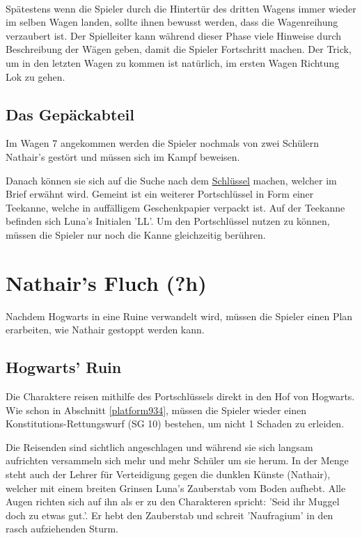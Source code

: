 \documentclass[]{scrartcl}
\begin{document}
~\\

Spätestens wenn die Spieler durch die Hintertür des dritten Wagens immer wieder im selben Wagen landen, sollte ihnen bewusst werden, dass die Wagenreihung verzaubert ist. Der Spielleiter kann während dieser Phase viele Hinweise durch Beschreibung der Wägen geben, damit die Spieler Fortschritt machen. Der Trick, um in den letzten Wagen zu kommen ist natürlich, im ersten Wagen Richtung Lok zu gehen.

\subsection{Das Gepäckabteil}

Im Wagen 7 angekommen werden die Spieler nochmals von zwei Schülern Nathair's gestört und müssen sich im Kampf beweisen.


Danach können sie sich auf die Suche nach dem \underline{Schlüssel} machen, welcher im Brief erwähnt wird. Gemeint ist ein weiterer Portschlüssel in Form einer Teekanne, welche in auffälligem Geschenkpapier verpackt ist. Auf der Teekanne befinden sich Luna's Initialen 'LL'. Um den Portschlüssel nutzen zu können, müssen die Spieler nur noch die Kanne gleichzeitig berühren.

\section{Nathair's Fluch (?h)}

Nachdem Hogwarts in eine Ruine verwandelt wird, müssen die Spieler einen Plan erarbeiten, wie Nathair gestoppt werden kann.

\subsection{Hogwarts' Ruin}

Die Charaktere reisen mithilfe des Portschlüssels direkt in den Hof von Hogwarts. Wie schon in Abschnitt \ref{platform934}, müssen die Spieler wieder einen Konstitutions-Rettungswurf (SG 10) bestehen, um nicht 1 Schaden zu erleiden.

Die Reisenden sind sichtlich angeschlagen und während sie sich langsam aufrichten versammeln sich mehr und mehr Schüler um sie herum. In der Menge steht auch der Lehrer für Verteidigung gegen die dunklen Künste (Nathair), welcher mit einem breiten Grinsen Luna's Zauberstab vom Boden aufhebt. Alle Augen richten sich auf ihn als er zu den Charakteren spricht: 'Seid ihr Muggel doch zu etwas gut.'. Er hebt den Zauberstab und schreit 'Naufragium' in den rasch aufziehenden Sturm.
\end{document}
